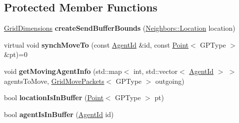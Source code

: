 \subsection*{Protected Member Functions}
\begin{DoxyCompactItemize}
\item 
\hypertarget{classrepast_1_1_shared_base_grid_a84acccc25e0e3e21f8d430a36c9d395a}{\hyperlink{classrepast_1_1_grid_dimensions}{Grid\-Dimensions} {\bfseries create\-Send\-Buffer\-Bounds} (\hyperlink{classrepast_1_1_neighbors_a7a695a73b614b849f12fd943329b8bdc}{Neighbors\-::\-Location} location)}\label{classrepast_1_1_shared_base_grid_a84acccc25e0e3e21f8d430a36c9d395a}

\item 
\hypertarget{classrepast_1_1_shared_base_grid_a51922e0249368abd598ead8101088732}{virtual void {\bfseries synch\-Move\-To} (const \hyperlink{classrepast_1_1_agent_id}{Agent\-Id} \&id, const \hyperlink{classrepast_1_1_point}{Point}$<$ G\-P\-Type $>$ \&pt)=0}\label{classrepast_1_1_shared_base_grid_a51922e0249368abd598ead8101088732}

\item 
\hypertarget{classrepast_1_1_shared_base_grid_a0ea39fedf8dcb4acd0c9011d323ca52d}{void {\bfseries get\-Moving\-Agent\-Info} (std\-::map$<$ int, std\-::vector$<$ \hyperlink{classrepast_1_1_agent_id}{Agent\-Id} $>$ $>$ agents\-To\-Move, \hyperlink{classrepast_1_1_grid_move_packets}{Grid\-Move\-Packets}$<$ G\-P\-Type $>$ outgoing)}\label{classrepast_1_1_shared_base_grid_a0ea39fedf8dcb4acd0c9011d323ca52d}

\item 
\hypertarget{classrepast_1_1_shared_base_grid_a96b291d6e5e8ae2a4100704a4af770c2}{bool {\bfseries location\-Is\-In\-Buffer} (\hyperlink{classrepast_1_1_point}{Point}$<$ G\-P\-Type $>$ pt)}\label{classrepast_1_1_shared_base_grid_a96b291d6e5e8ae2a4100704a4af770c2}

\item 
\hypertarget{classrepast_1_1_shared_base_grid_a0510379d3dab88d33d459b6ae063d07d}{bool {\bfseries agent\-Is\-In\-Buffer} (\hyperlink{classrepast_1_1_agent_id}{Agent\-Id} id)}\label{classrepast_1_1_shared_base_grid_a0510379d3dab88d33d459b6ae063d07d}

\end{DoxyCompactItemize}

